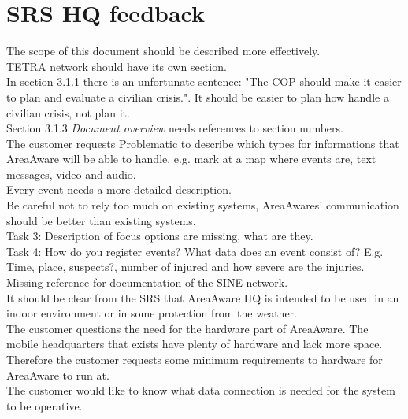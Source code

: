 \section*{SRS HQ feedback}
The scope of this document should be described more effectively.\\
TETRA network should have its own section.\\
In section 3.1.1 there is an unfortunate sentence: "The COP should make it easier to plan and evaluate a civilian crisis.". It should be easier to plan how handle a civilian crisis, not plan it.\\
Section 3.1.3 \emph{Document overview} needs references to section numbers.\\
The customer requests Problematic to describe which types for informations that AreaAware will be able to handle, e.g. mark at a map where events are, text messages, video and audio.\\
Every event needs a more detailed description.\\
Be careful not to rely too much on existing systems, AreaAwares' communication should be better than existing systems.\\
Task 3: Description of focus options are missing, what are they.\\
Task 4: How do you register events? What data does an event consist of? E.g. Time, place, suspects?, number of injured and how severe are the injuries.\\
Missing reference for documentation of the SINE network.\\
It should be clear from the SRS that AreaAware HQ is intended to be used in an indoor environment or in some protection from the weather.\\
The customer questions the need for the hardware part of AreaAware. The mobile headquarters that exists have plenty of hardware and lack more space.
Therefore the customer requests some minimum requirements to hardware for AreaAware to run at.\\
The customer would like to know what data connection is needed for the system to be operative.\\

